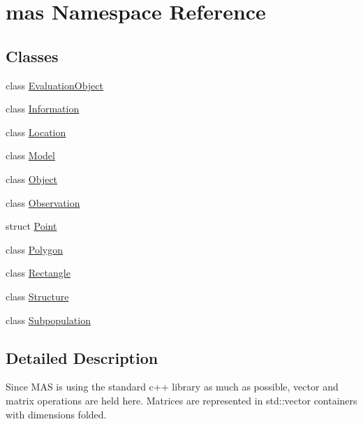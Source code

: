 \hypertarget{namespacemas}{}\section{mas Namespace Reference}
\label{namespacemas}
\subsection*{Classes}
\begin{DoxyCompactItemize}
\item 
class \hyperlink{classmas_1_1_evaluation_object}{Evaluation\+Object}
\item 
class \hyperlink{classmas_1_1_information}{Information}
\item 
class \hyperlink{classmas_1_1_location}{Location}
\item 
class \hyperlink{classmas_1_1_model}{Model}
\item 
class \hyperlink{classmas_1_1_object}{Object}
\item 
class \hyperlink{classmas_1_1_observation}{Observation}
\item 
struct \hyperlink{structmas_1_1_point}{Point}
\item 
class \hyperlink{classmas_1_1_polygon}{Polygon}
\item 
class \hyperlink{classmas_1_1_rectangle}{Rectangle}
\item 
class \hyperlink{classmas_1_1_structure}{Structure}
\item 
class \hyperlink{classmas_1_1_subpopulation}{Subpopulation}
\end{DoxyCompactItemize}


\subsection{Detailed Description}
Since M\+A\+S is using the standard c++ library as much as possible, vector and matrix operations are held here. Matrices are represented in std\+::vector containers with dimensions folded. 